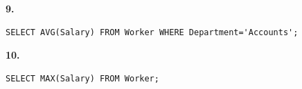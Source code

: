 \begin{chSixSideBySide}[.48]
\par\noindent\begin{minipage}{\linewidth}\textbf{9.}\par
\begin{verbatim}
SELECT AVG(Salary) FROM Worker WHERE Department='Accounts';
\end{verbatim}
\end{minipage}\par
\chSixNextColumn
\par\noindent\begin{minipage}{\linewidth}\textbf{10.}\par
\begin{verbatim}
SELECT MAX(Salary) FROM Worker;
\end{verbatim}
\end{minipage}\par
\end{chSixSideBySide}

